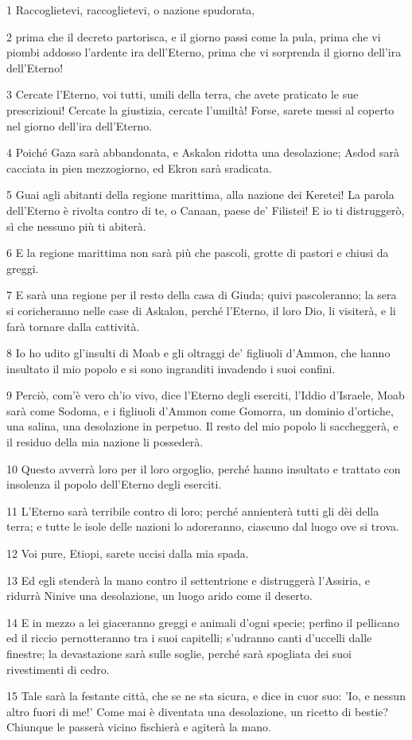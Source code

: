 \par 1 Raccoglietevi, raccoglietevi, o nazione spudorata,
\par 2 prima che il decreto partorisca, e il giorno passi come la pula, prima che vi piombi addosso l'ardente ira dell'Eterno, prima che vi sorprenda il giorno dell'ira dell'Eterno!
\par 3 Cercate l'Eterno, voi tutti, umili della terra, che avete praticato le sue prescrizioni! Cercate la giustizia, cercate l'umiltà! Forse, sarete messi al coperto nel giorno dell'ira dell'Eterno.
\par 4 Poiché Gaza sarà abbandonata, e Askalon ridotta una desolazione; Asdod sarà cacciata in pien mezzogiorno, ed Ekron sarà sradicata.
\par 5 Guai agli abitanti della regione marittima, alla nazione dei Keretei! La parola dell'Eterno è rivolta contro di te, o Canaan, paese de' Filistei! E io ti distruggerò, sì che nessuno più ti abiterà.
\par 6 E la regione marittima non sarà più che pascoli, grotte di pastori e chiusi da greggi.
\par 7 E sarà una regione per il resto della casa di Giuda; quivi pascoleranno; la sera si coricheranno nelle case di Askalon, perché l'Eterno, il loro Dio, li visiterà, e li farà tornare dalla cattività.
\par 8 Io ho udito gl'insulti di Moab e gli oltraggi de' figliuoli d'Ammon, che hanno insultato il mio popolo e si sono ingranditi invadendo i suoi confini.
\par 9 Perciò, com'è vero ch'io vivo, dice l'Eterno degli eserciti, l'Iddio d'Israele, Moab sarà come Sodoma, e i figliuoli d'Ammon come Gomorra, un dominio d'ortiche, una salina, una desolazione in perpetuo. Il resto del mio popolo li saccheggerà, e il residuo della mia nazione li possederà.
\par 10 Questo avverrà loro per il loro orgoglio, perché hanno insultato e trattato con insolenza il popolo dell'Eterno degli eserciti.
\par 11 L'Eterno sarà terribile contro di loro; perché annienterà tutti gli dèi della terra; e tutte le isole delle nazioni lo adoreranno, ciascuno dal luogo ove si trova.
\par 12 Voi pure, Etiopi, sarete uccisi dalla mia spada.
\par 13 Ed egli stenderà la mano contro il settentrione e distruggerà l'Assiria, e ridurrà Ninive una desolazione, un luogo arido come il deserto.
\par 14 E in mezzo a lei giaceranno greggi e animali d'ogni specie; perfino il pellicano ed il riccio pernotteranno tra i suoi capitelli; s'udranno canti d'uccelli dalle finestre; la devastazione sarà sulle soglie, perché sarà spogliata dei suoi rivestimenti di cedro.
\par 15 Tale sarà la festante città, che se ne sta sicura, e dice in cuor suo: 'Io, e nessun altro fuori di me!' Come mai è diventata una desolazione, un ricetto di bestie? Chiunque le passerà vicino fischierà e agiterà la mano.

